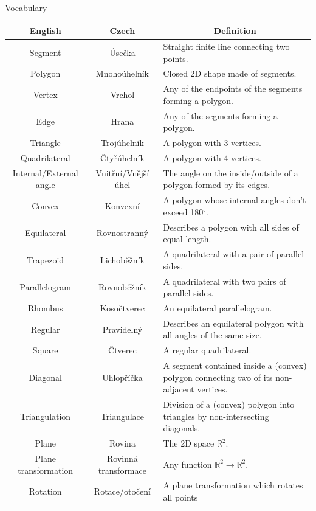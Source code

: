 \documentclass[final]{beamer}
\newlength{\colwidth}
\newcommand{\R}{\mathbb{R}}
\begin{document}
\begin{frame}[t]
\begin{columns}[t]
\begin{column}{\colwidth}
 \begin{block}{Vocabulary}
   \begin{center}
   {\def\arraystretch{1.5}\tabcolsep=10pt
    \begin{tabular}{c | c | p{}}
     \textbf{English} & \textbf{Czech} & \multicolumn{1}{c}{\textbf{Definition}}\\
     \toprule
     Segment & Úsečka & Straight finite line connecting two points.\\
     Polygon & Mnohoúhelník & Closed 2D shape made of segments.\\
     Vertex & Vrchol & Any of the endpoints of the segments forming a polygon.\\
     Edge & Hrana & Any of the segments forming a polygon.\\
     Triangle & Trojúhelník & A polygon with 3 vertices.\\
     Quadrilateral & Čtyřúhelník & A polygon with 4 vertices.\\
     Internal/External angle & Vnitřní/Vnější úhel & The angle on the
     inside/outside of a polygon formed by its edges.\\
     Convex & Konvexní & A polygon whose internal angles don't exceed 180$^{
     \circ }$.\\
     Equilateral & Rovnostranný & Describes a polygon with all sides of equal
     length.\\
     Trapezoid & Lichoběžník & A quadrilateral with a pair of parallel sides.\\
     Parallelogram & Rovnoběžník & A quadrilateral with two pairs of parallel
     sides.\\
     Rhombus & Kosočtverec & An equilateral parallelogram.\\
     Regular & Pravidelný & Describes an equilateral polygon with all angles of
     the same size.\\
     Square & Čtverec & A regular quadrilateral.\\
     Diagonal & Uhlopříčka & A segment contained inside a (convex) polygon
     connecting two of its non-adjacent vertices.\\
     Triangulation & Triangulace & Division of a (convex) polygon into triangles
     by non-intersecting diagonals.\\
     Plane & Rovina & The 2D space $\R^2$.\\
     Plane transformation & Rovinná transformace & Any function $\R^2 \to
     \R^2$.\\
     Rotation & Rotace/otočení & A plane transformation which rotates all points

\end{tabular}}
\end{center}
\end{block}
\end{column}
\end{columns}
\end{frame}
\end{document}
